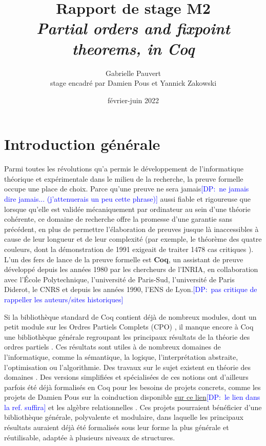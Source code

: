 \documentclass{article}
\title{Rapport de stage M2 \\ 
\textit{Partial orders and fixpoint theorems, in Coq}}
\date{février-juin 2022}
\author{Gabrielle Pauvert\\
stage encadré par Damien Pous et Yannick Zakowski}
\newcommand\dam[1]{\textcolor{blue}{{[DP:~#1]}}}
\theoremstyle{definition}
\begin{document}
\maketitle

\section*{Introduction générale}

Parmi toutes les révolutions qu'a permis le développement de l'informatique théorique et expérimentale dans le milieu de la recherche, la preuve formelle occupe une place de choix. Parce qu'une preuve ne sera jamais\dam{ne jamais dire jamais... (j'attenuerais un peu cette phrase)} aussi fiable et rigoureuse que lorsque qu'elle est validée mécaniquement par ordinateur au sein d'une théorie cohérente, ce domaine de recherche offre la promesse d'une garantie sans précédent, en plus de permettre l'élaboration de preuves jusque là inaccessibles à cause de leur longueur et de leur complexité (par exemple, le théorème des quatre couleurs, dont la démonstration de 1991 exigeait de traiter 1478 cas critiques \cite{4color}). L'un des fers de lance de la preuve formelle est \textbf{Coq}, un assistant de preuve développé depuis les années 1980 par les chercheurs de l'INRIA, en collaboration avec l'École Polytechnique, l'université de Paris-Sud, l'université de Paris Diderot, le CNRS et depuis les années 1990, l'ENS de Lyon.\dam{pas critique de rappeller les auteurs/sites historiques}

Si la bibliothèque standard de Coq contient déjà de nombreux modules, dont un petit module sur les Ordres Partiels Complets (CPO) \cite{coqCPO}, il manque encore à Coq une bibliothèque générale regroupant les principaux résultats de la théorie des ordres partiels \cite{main}. Ces résultats sont utiles à de nombreux domaines de l'informatique, comme la sémantique, la logique, l'interprétation abstraite, l'optimisation ou l'algorithmie. Des travaux sur le sujet existent en théorie des domaines \cite{dockins}. Des versions simplifiées et spécialisées de ces notions ont d'ailleurs parfois été déjà formalisés en Coq pour les besoins de projets concrets, comme les projets de Damien Pous sur la coinduction \cite{coind-theory} disponible \href{https://github.com/damien-pous/coinduction}{sur ce lien}\dam{le lien dans la ref. suffira} et les algèbre relationnelles \cite{relalg}. Ces projets pourraient bénéficier d'une bibliothèque générale, polyvalente et modulaire, dans laquelle les principaux résultats auraient déjà été formalisés sous leur forme la plus générale et réutilisable, adaptée à plusieurs niveaux de structures.
\end{document}
